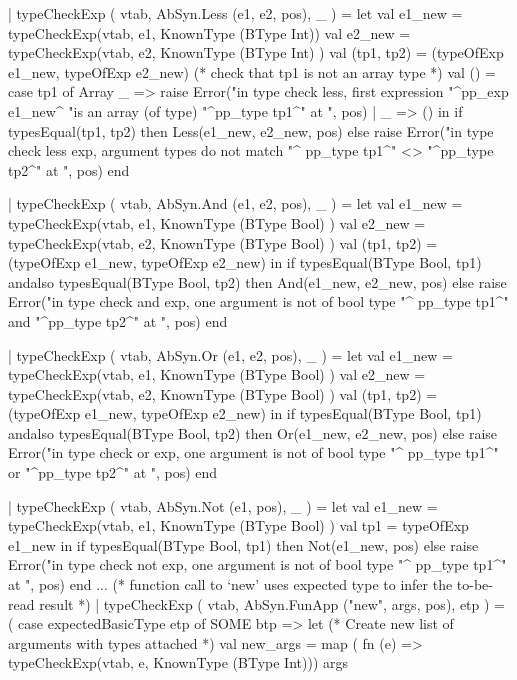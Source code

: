 \documentclass[10pt]{article}
\begin{document}
\begin{fancycode}[frame=lines,fontsize=\scriptsize,label=\textit{edited code - SRC/Type.sml}]
 | typeCheckExp ( vtab, AbSyn.Less (e1, e2, pos), _ ) =
     let val e1_new = typeCheckExp(vtab, e1, KnownType (BType Int))
         val e2_new = typeCheckExp(vtab, e2, KnownType (BType Int) )
         val (tp1, tp2) = (typeOfExp e1_new, typeOfExp e2_new)
         (* check that tp1 is not an array type *)
         val () = case tp1 of
                    Array _ => raise Error("in type check less, first expression "^pp_exp e1_new^
                                           "is an array (of type) "^pp_type tp1^" at ", pos)
                  | _ => ()
     in  if  typesEqual(tp1, tp2)
         then Less(e1_new, e2_new, pos)
         else raise Error("in type check less exp, argument types do not match "^
                          pp_type tp1^" <> "^pp_type tp2^" at ", pos)
     end

 | typeCheckExp ( vtab, AbSyn.And (e1, e2, pos), _ ) =
     let val e1_new = typeCheckExp(vtab, e1, KnownType (BType Bool) )
         val e2_new = typeCheckExp(vtab, e2, KnownType (BType Bool) )
         val (tp1, tp2) = (typeOfExp e1_new, typeOfExp e2_new)
     in  if  typesEqual(BType Bool, tp1) andalso typesEqual(BType Bool, tp2)
         then And(e1_new, e2_new, pos)
         else raise Error("in type check and exp, one argument is not of bool type "^
                          pp_type tp1^" and "^pp_type tp2^" at ", pos)
     end

 | typeCheckExp ( vtab, AbSyn.Or  (e1, e2, pos), _ ) =
     let val e1_new = typeCheckExp(vtab, e1, KnownType (BType Bool) )
         val e2_new = typeCheckExp(vtab, e2, KnownType (BType Bool) )
         val (tp1, tp2) = (typeOfExp e1_new, typeOfExp e2_new)
     in
         if typesEqual(BType Bool, tp1) andalso typesEqual(BType Bool, tp2)
         then Or(e1_new, e2_new, pos)
         else raise Error("in type check or exp, one argument is not of bool type "^
                           pp_type tp1^" or "^pp_type tp2^" at ", pos)
     end

 | typeCheckExp ( vtab, AbSyn.Not (e1,    pos), _ ) =
     let val e1_new = typeCheckExp(vtab, e1, KnownType (BType Bool) )
         val tp1 = typeOfExp e1_new
     in  if  typesEqual(BType Bool, tp1)
         then Not(e1_new, pos)
         else raise Error("in type check not exp, one argument is not of bool type "^
                           pp_type tp1^" at ", pos)
     end
...
 (* function call to `new' uses expected type to infer the to-be-read result *)
 | typeCheckExp ( vtab, AbSyn.FunApp ("new", args, pos), etp ) =
     ( case expectedBasicType etp of
         SOME btp =>
           let
             (* Create new list of arguments with types attached *)
             val new_args = map ( fn (e) => typeCheckExp(vtab, e, KnownType (BType Int))) args


\end{fancycode}
\end{document}

